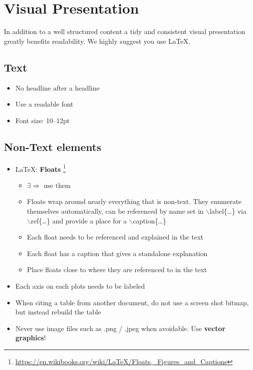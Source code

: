 \documentclass[twocolumn]{mlai-guide}
\begin{document}
\section{Visual Presentation}

In addition to a well structured content a tidy and consistent visual presentation greatly benefits readability. We highly suggest you use \LaTeX.

\subsection{Text}
\begin{itemize}
	\item No headline after a headline
	\item Use a readable font
	\item Font size: 10--12pt
\end{itemize}

\subsection{Non-Text elements}

\begin{itemize}
	\item \LaTeX: \textbf{Floats} \footnote{\href{https://en.wikibooks.org/wiki/LaTeX/Floats,_Figures_and_Captions}{https://en.wikibooks.org/wiki/LaTeX/Floats,\_Figures\_and\_Captions}}
	\begin{itemize}
		\item $\exists \Rightarrow$ use them
		\item Floats wrap around nearly everything that is non-text. They enumerate themselves automatically, can be referenced by name set in $\backslash$label\{\dots\} via $\backslash $ref\{\dots\} and provide a place for a $\backslash$caption\{\dots\}
		\item Each float needs to be referenced and explained in the text
		\item Each float has a caption that gives a standalone explanation
		\item Place floats close to where they are referenced to in the text
	\end{itemize}
	\item Each axis on each plots needs to be labeled
	\item When citing a table from another document, do not use a screen shot bitmap, but instead rebuild the table 
	\item Never use image files such as .png / .jpeg when avoidable. Use \textbf{vector graphics}!
\end{itemize}
\end{document}
